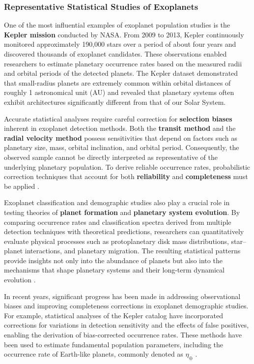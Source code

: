 \subsubsection{Representative Statistical Studies of Exoplanets}

One of the most influential examples of exoplanet population studies is the \textbf{Kepler mission} conducted by NASA. From 2009 to 2013, Kepler continuously monitored approximately 190,000 stars over a period of about four years and discovered thousands of exoplanet candidates. These observations enabled researchers to estimate planetary occurrence rates based on the measured radii and orbital periods of the detected planets. The Kepler dataset demonstrated that small-radius planets are extremely common within orbital distances of roughly 1 astronomical unit (AU) and revealed that planetary systems often exhibit architectures significantly different from that of our Solar System.

Accurate statistical analyses require careful correction for \textbf{selection biases} inherent in exoplanet detection methods. Both the \textbf{transit method} and the \textbf{radial velocity method} possess sensitivities that depend on factors such as planetary size, mass, orbital inclination, and orbital period. Consequently, the observed sample cannot be directly interpreted as representative of the underlying planetary population. To derive reliable occurrence rates, probabilistic correction techniques that account for both \textbf{reliability} and \textbf{completeness} must be applied \cite{bryson2021}.

Exoplanet classification and demographic studies also play a crucial role in testing theories of \textbf{planet formation} and \textbf{planetary system evolution}. By comparing occurrence rates and classification spectra derived from multiple detection techniques with theoretical predictions, researchers can quantitatively evaluate physical processes such as protoplanetary disk mass distributions, star--planet interactions, and planetary migration. The resulting statistical patterns provide insights not only into the abundance of planets but also into the mechanisms that shape planetary systems and their long-term dynamical evolution \cite{gaudi2020}.

In recent years, significant progress has been made in addressing observational biases and improving completeness corrections in exoplanet demographic studies. For example, statistical analyses of the Kepler catalog have incorporated corrections for variations in detection sensitivity and the effects of false positives, enabling the derivation of bias-corrected occurrence rates. These methods have been used to estimate fundamental population parameters, including the occurrence rate of Earth-like planets, commonly denoted as \textbf{$\eta_{\oplus}$} \cite{bryson2021}.

